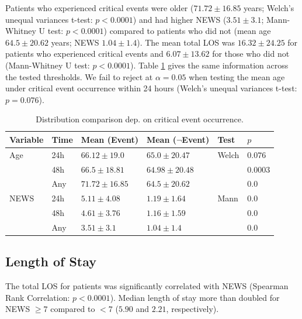 \documentclass[10pt,journal, compsoc]{IEEEtran}
\begin{document}
Patients who experienced critical events were older ($71.72 \pm 16.85$ years; Welch's unequal variances t-test: $p < 0.0001$) and had higher NEWS ($3.51 \pm 3.1$; Mann-Whitney U test: $p < 0.0001$) compared to patients who did not (mean age $64.5 \pm 20.62$ years; NEWS $1.04 \pm 1.4$). The mean total LOS was $16.32 \pm 24.25$ for patients who experienced critical events and $6.07 \pm 13.62$ for those who did not (Mann-Whitney U test: $p < 0.0001$). Table \ref{tab:criticalevent_stats} gives the same information across the tested thresholds. We fail to reject at $\alpha=0.05$ when testing the mean age under critical event occurrence within 24 hours (Welch's unequal variances t-test: $p = 0.076$).

\begin{table}[tbp]
    \renewcommand{\arraystretch}{1.3}
    \centering
    \caption{Distribution comparison dep. on critical event occurrence.}
    \label{tab:criticalevent_stats}
    \begin{tabular}{llllll}
        \toprule
        Variable & Time & Mean (Event)      & Mean ($\lnot$Event) & Test  & $p$      \\
        \midrule
        Age      & 24h  & $66.12 \pm 19.0$  & $65.0 \pm 20.47$    & Welch & $0.076$  \\
                 & 48h  & $66.5 \pm 18.81$  & $64.98 \pm 20.48$   &       & $0.0003$ \\
                 & Any  & $71.72 \pm 16.85$ & $64.5 \pm 20.62$    &       & $0.0$    \\
        NEWS     & 24h  & $5.11 \pm 4.08$   & $1.19 \pm 1.64$     & Mann  & $0.0$    \\
                 & 48h  & $4.61 \pm 3.76$   & $1.16 \pm 1.59$     &       & $0.0$    \\
                 & Any  & $3.51 \pm 3.1$    & $1.04 \pm 1.4$      &       & $0.0$    \\

        \bottomrule
    \end{tabular}
\end{table}

\subsection{Length of Stay} The total LOS for patients was significantly correlated with NEWS (Spearman Rank Correlation: $p < 0.0001$). Median length of stay more than doubled for NEWS $\geq 7$ compared to $<7$ ($5.90$ and $2.21$, respectively).
\end{document}
